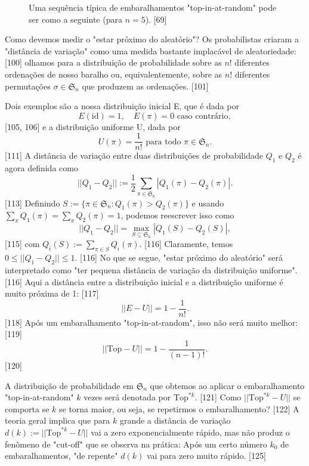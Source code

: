 \documentclass[a4paper]{article}
\begin{document}
\begin{figure}[h!]
    \centering
    \caption{Uma sequência típica de embaralhamentos "top-in-at-random" pode ser como a seguinte (para $n=5$). [69]}
\end{figure}

Como devemos medir o "estar próximo do aleatório"? Os probabilistas criaram a "distância de variação" como uma medida bastante implacável de aleatoriedade: [100] olhamos para a distribuição de probabilidade sobre as $n!$ diferentes ordenações de nosso baralho ou, equivalentemente, sobre as $n!$ diferentes permutações $\sigma \in \mathfrak{S}_n$ que produzem as ordenações. [101]

Dois exemplos são a nossa distribuição inicial E, que é dada por
$$ E(\text{id}) = 1, \quad E(\pi) = 0 \text{ caso contrário}, $$ [105, 106]
e a distribuição uniforme U, dada por
$$ U(\pi) = \frac{1}{n!} \text{ para todo } \pi \in \mathfrak{S}_n. $$ [111]
A distância de variação entre duas distribuições de probabilidade $Q_1$ e $Q_2$ é agora definida como
$$ ||Q_1 - Q_2|| := \frac{1}{2} \sum_{\pi \in \mathfrak{S}_n} |Q_1(\pi) - Q_2(\pi)|. $$ [113]
Definindo $S := \{\pi \in \mathfrak{S}_n : Q_1(\pi) > Q_2(\pi)\}$ e usando $\sum_\pi Q_1(\pi) = \sum_\pi Q_2(\pi) = 1$, podemos reescrever isso como
$$ ||Q_1 - Q_2|| = \max_{S \subseteq \mathfrak{S}_n} |Q_1(S) - Q_2(S)|, $$ [115]
com $Q_i(S) := \sum_{\pi \in S} Q_i(\pi)$. [116] Claramente, temos $0 \le ||Q_1 - Q_2|| \le 1$. [116] No que se segue, "estar próximo do aleatório" será interpretado como "ter pequena distância de variação da distribuição uniforme". [116] Aqui a distância entre a distribuição inicial e a distribuição uniforme é muito próxima de 1: [117]
$$ ||E - U|| = 1 - \frac{1}{n!}. $$ [118]
Após um embaralhamento "top-in-at-random", isso não será muito melhor: [119]
$$ ||\text{Top} - U|| = 1 - \frac{1}{(n-1)!}. $$ [120]

A distribuição de probabilidade em $\mathfrak{S}_n$ que obtemos ao aplicar o embaralhamento "top-in-at-random" $k$ vezes será denotada por $\text{Top}^{*k}$. [121] Como $||\text{Top}^{*k} - U||$ se comporta se $k$ se torna maior, ou seja, se repetirmos o embaralhamento? [122] A teoria geral implica que para $k$ grande a distância de variação $d(k) := ||\text{Top}^{*k} - U||$ vai a zero exponencialmente rápido, mas não produz o fenômeno de "cut-off" que se observa na prática: Após um certo número $k_0$ de embaralhamentos, "de repente" $d(k)$ vai para zero muito rápido. [125]
\end{document}
